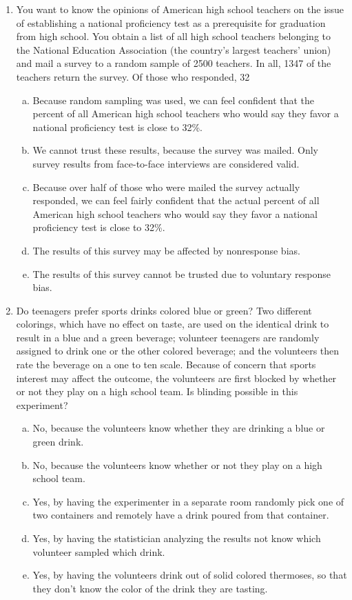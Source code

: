 \documentclass[a4paper,12pt,twoside]{book}
\begin{document}
\begin{enumerate}
\item  You want to know the opinions of American high school teachers on the issue of establishing a national proficiency test as a prerequisite for graduation from high school. You obtain a list of all high school teachers belonging to the National Education Association (the country’s largest teachers’ union) and mail a survey to a random sample of 2500 teachers. In all, 1347 of the teachers return the survey. Of those who responded, 32%
    \begin{enumerate}[(a)]
        \item Because random sampling was used, we can feel confident that the percent of all American high school teachers who would say they favor a national proficiency test is close to 32\%.
        \item  We cannot trust these results, because the survey was mailed. Only survey results from face-to-face interviews are considered valid.
        \item Because over half of those who were mailed the survey actually responded, we can feel fairly confident that the actual percent of all American high school teachers who would say they favor a national proficiency test is close to 32\%.
        \item  The results of this survey may be affected by nonresponse bias.
        \item The results of this survey cannot be trusted due to voluntary response bias.
    \end{enumerate}                                            
 \item Do teenagers prefer sports drinks colored blue or green? Two different colorings, which have no effect on taste, are used on the identical drink to result in a blue and a green beverage; volunteer teenagers are randomly assigned to drink one or the other colored beverage; and the volunteers then rate the beverage on a one to ten scale. Because of concern that sports interest may affect the outcome, the volunteers are first blocked by whether or not they play on a high school team. Is blinding possible in this experiment?
    \begin{enumerate}[(a)]
        \item  No, because the volunteers know whether they are drinking a blue or green drink.
        \item No, because the volunteers know whether or not they play on a high school team.
        \item Yes, by having the experimenter in a separate room randomly pick one of two containers and remotely have a drink poured from that container.
        \item Yes, by having the statistician analyzing the results not know which volunteer sampled which drink.
        \item  Yes, by having the volunteers drink out of solid colored thermoses, so that they don’t know the color of the drink they are tasting.
    \end{enumerate}
 
 
\end{enumerate}
\end{document}
